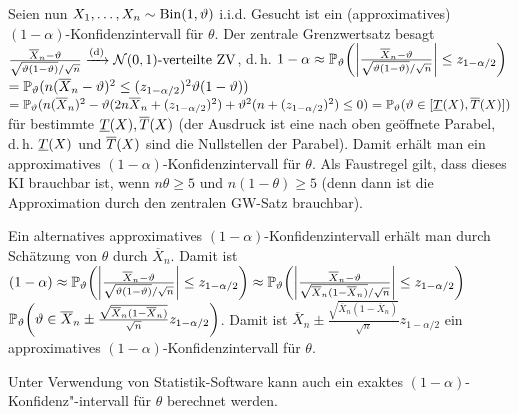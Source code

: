 \begin{Bsp}
    Seien nun $X_1, \dotsc, X_n \sim \operatorname{Bin}(1, \vartheta)$ i.i.d.
    Gesucht ist ein (approximatives) $(1 - \alpha)$-Konfidenzintervall für $\theta$.
    Der zentrale Grenzwertsatz besagt\\
    $\frac{\overline{X}_n - \vartheta}{\sqrt{\vartheta (1 - \vartheta)}/\sqrt{n}} \xrightarrow{\text{(d)}}
    \mathcal{N}(0, 1)\text{-verteilte ZV}$,
    d.\,h. $1 - \alpha \approx \mathbb{P}_\vartheta\!\left(\left|\frac{\overline{X}_n - \vartheta}
    {\sqrt{\vartheta (1 - \vartheta)}/\sqrt{n}}\right| \le z_{1-\alpha/2}\right)$\\
    $= \mathbb{P}_\vartheta(n (\overline{X}_n - \vartheta)^2 \le (z_{1-\alpha/2})^2 \vartheta (1 - \vartheta))$\\
    $= \mathbb{P}_\vartheta(n (\overline{X}_n)^2 - \vartheta (2n \overline{X}_n + (z_{1-\alpha/2})^2) +
    \vartheta^2 (n + (z_{1-\alpha/2})^2) \le 0) = \mathbb{P}_\vartheta(\vartheta \in [\underline{T}(X), \overline{T}(X)])$\\
    für bestimmte $\underline{T}(X), \overline{T}(X)$
    (der Ausdruck ist eine nach oben geöffnete Parabel, d.\,h. $\underline{T}(X)$ und $\overline{T}(X)$ sind die
    Nullstellen der Parabel).
    Damit erhält man ein approximatives $(1 - \alpha)$-Konfidenzintervall für $\theta$.
    Als Faustregel gilt, dass dieses KI brauchbar ist, wenn $n\theta \ge 5$ und
    $n(1-\theta) \ge 5$
    (denn dann ist die Approximation durch den zentralen GW-Satz brauchbar).

    Ein alternatives approximatives $(1 - \alpha)$-Konfidenzintervall erhält man durch
    Schätzung von $\theta$ durch $\overline{X}_n$.
    Damit ist
    $(1 - \alpha) \approx \mathbb{P}_\vartheta\!\left(\left|\frac{\overline{X}_n - \vartheta}
    {\sqrt{\vartheta (1 - \vartheta)}/\sqrt{n}}\right| \le z_{1-\alpha/2}\right)
    \approx \mathbb{P}_\vartheta\!\left(\left|\frac{\overline{X}_n - \vartheta}
    {\sqrt{\overline{X}_n (1 - \overline{X}_n)}/\sqrt{n}}\right| \le z_{1-\alpha/2}\right)$\\
    $\mathbb{P}_\vartheta\!\left(\vartheta \in \overline{X}_n \pm
    \frac{\sqrt{\overline{X}_n (1 - \overline{X}_n)}}{\sqrt{n}} z_{1 - \alpha/2}\right)$.
    Damit ist $\overline{X}_n \pm
    \frac{\sqrt{\overline{X}_n (1 - \overline{X}_n)}}{\sqrt{n}} z_{1 - \alpha/2}$ ein
    approximatives $(1 - \alpha)$-Konfidenzintervall für $\theta$.
\end{Bsp}

\begin{Bem}
    Unter Verwendung von Statistik-Software kann auch ein exaktes
    $(1 - \alpha)$-Konfidenz"-intervall für $\theta$ berechnet werden.
\end{Bem}

